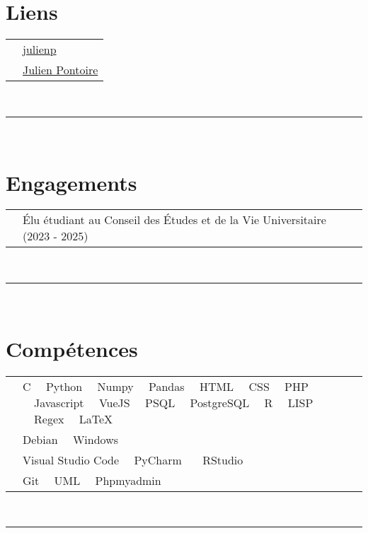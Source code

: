 \documentclass[oneside]{article}
\begin{document}
{\begin{minipage}[t][\textheight-2\fboxsep-2\fboxrule][t]{\dimexpr0.40\textwidth-2\fboxrule-2\fboxsep\relax}
        \section*{\large Liens}
        \begin{tabular}{cl}
            \faGithub{}   & \href{https://github.com/Jean-Pedro}{julienp} \\
            \faLinkedin{} & \href{https://www.linkedin.com/in/julien-pontoire-0a50a42b1/}{Julien Pontoire} \\
        \end{tabular}
        \vspace{10pt} \\
        \rule{\linewidth}{0.4pt} \\

        \section*{\large Engagements}
        \begin{tabularx}{\textwidth}{cY}
            & Élu étudiant au Conseil des Études et de la Vie Universitaire (2023 - 2025)
        \end{tabularx}
        \vspace{7pt} \\
        \rule{\linewidth}{0.4pt} \\
        \section*{\large Compétences}
        \begin{tabularx}{\textwidth}{cY}
            \faCode{}        & C \ \ Python \ \ Numpy \ \ Pandas \ \ HTML \ \ CSS \ \ PHP \ \ Javascript \ \ VueJS \ \ PSQL \ \ PostgreSQL \ \ R \ \ LISP \ \ Regex \ \ LaTeX \\
            \faCogs{}        & Debian \ \ Windows \\
            \faLaptopCode{}  & Visual Studio Code \ \ PyCharm \ \ \ RStudio \\
            \faToolbox{}     & Git \ \ UML \ \ Phpmyadmin
        \end{tabularx}
        \vspace{1pt} \\
        \rule{\linewidth}{0.4pt}
        

\end{minipage}}
\end{document}
